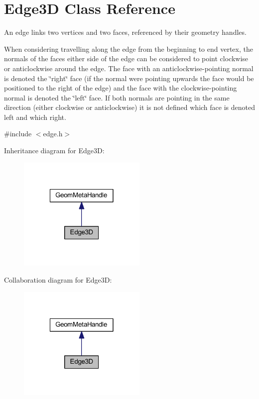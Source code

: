 \hypertarget{class_edge3_d}{\section{Edge3\-D Class Reference}
\label{class_edge3_d}
}


An edge links two vertices and two faces, referenced by their geometry handles.\par
 When considering travelling along the edge from the beginning to end vertex, the normals of the faces either side of the edge can be considered to point clockwise or anticlockwise around the edge. The face with an anticlockwise-\/pointing normal is denoted the \char`\"{}right\char`\"{} face (if the normal were pointing upwards the face would be positioned to the right of the edge) and the face with the clockwise-\/pointing normal is denoted the \char`\"{}left\char`\"{} face. If both normals are pointing in the same direction (either clockwise or anticlockwise) it is not defined which face is denoted left and which right.  




{\ttfamily \#include $<$edge.\-h$>$}



Inheritance diagram for Edge3\-D\-:
\nopagebreak
\begin{figure}[H]
\begin{center}
\leavevmode
\includegraphics[width=174pt]{class_edge3_d__inherit__graph}
\end{center}
\end{figure}


Collaboration diagram for Edge3\-D\-:
\nopagebreak
\begin{figure}[H]
\begin{center}
\leavevmode
\includegraphics[width=174pt]{class_edge3_d__coll__graph}
\end{center}
\end{figure}
